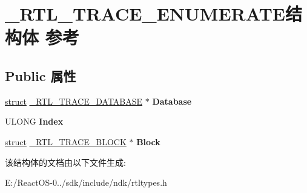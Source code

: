 \hypertarget{struct___r_t_l___t_r_a_c_e___e_n_u_m_e_r_a_t_e}{}\section{\+\_\+\+R\+T\+L\+\_\+\+T\+R\+A\+C\+E\+\_\+\+E\+N\+U\+M\+E\+R\+A\+T\+E结构体 参考}
\label{struct___r_t_l___t_r_a_c_e___e_n_u_m_e_r_a_t_e}
\subsection*{Public 属性}
\begin{DoxyCompactItemize}
\item 
\mbox{\label{struct___r_t_l___t_r_a_c_e___e_n_u_m_e_r_a_t_e_a127f13399c0507e66f05739a880ae5a1}} 
\hyperlink{interfacestruct}{struct} \hyperlink{struct___r_t_l___t_r_a_c_e___d_a_t_a_b_a_s_e}{\+\_\+\+R\+T\+L\+\_\+\+T\+R\+A\+C\+E\+\_\+\+D\+A\+T\+A\+B\+A\+SE} $\ast$ {\bfseries Database}
\item 
\mbox{\label{struct___r_t_l___t_r_a_c_e___e_n_u_m_e_r_a_t_e_af860bba89cd801532fa83b46c6e4fa74}} 
U\+L\+O\+NG {\bfseries Index}
\item 
\mbox{\label{struct___r_t_l___t_r_a_c_e___e_n_u_m_e_r_a_t_e_a224da134644d6892c50c9122d75bbc78}} 
\hyperlink{interfacestruct}{struct} \hyperlink{struct___r_t_l___t_r_a_c_e___b_l_o_c_k}{\+\_\+\+R\+T\+L\+\_\+\+T\+R\+A\+C\+E\+\_\+\+B\+L\+O\+CK} $\ast$ {\bfseries Block}
\end{DoxyCompactItemize}


该结构体的文档由以下文件生成\+:\begin{DoxyCompactItemize}
\item 
E\+:/\+React\+O\+S-\/0../sdk/include/ndk/rtltypes.\+h\end{DoxyCompactItemize}
